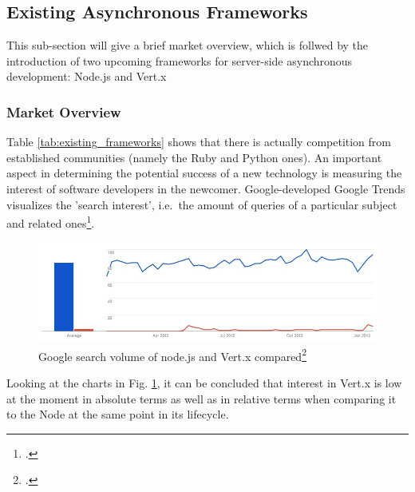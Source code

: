 


\subsection{Existing Asynchronous Frameworks}
\label{existing_frameworks}
This sub-section will give a brief market overview, which is follwed by the introduction of two upcoming frameworks for server-side asynchronous development: Node.js and Vert.x


\subsubsection{Market Overview}
\label{frameworks_overview}

Table \ref{tab:existing_frameworks} shows that there is actually competition from established communities (namely the Ruby and Python ones). An important aspect in determining the potential success of a new technology is measuring the interest of software developers in the newcomer. Google-developed Google Trends visualizes the 'search interest', i.e.\ the amount of queries of a particular subject and related ones\footcite[Cf.][]{g_trends}.

\begin{figure}[hbtp]
\centering
\includegraphics[scale=0.5]{img/googletrend_nodevertx}
\caption{Google search volume of node.js and Vert.x compared\footcite[Cf.][]{g_trends}\label{img_googletrend_nodevertx}}
\end{figure}

Looking at the charts in Fig. \ref{img_googletrend_nodevertx}, it can be concluded that interest in Vert.x is low at the moment in absolute terms as well as in relative terms when comparing it to the Node at the same point in its lifecycle.

